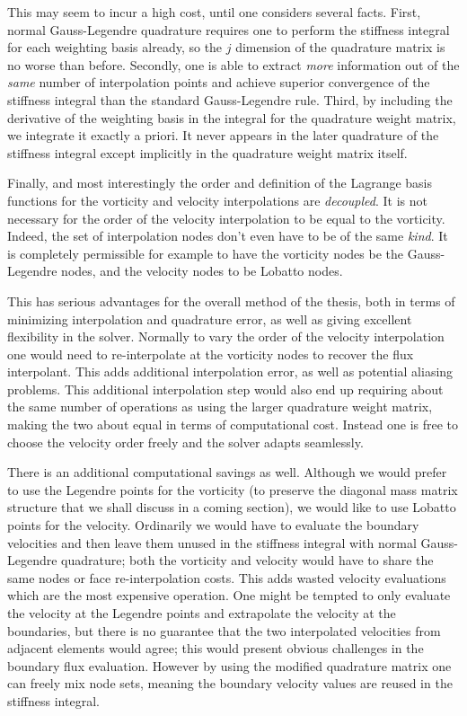 \documentclass[letterpaper,12pt]{report}
\begin{document}
This may seem to incur a high cost, until one considers several facts. First, normal Gauss-Legendre quadrature requires one to perform the stiffness integral for each weighting basis already, so the $j$ dimension of the quadrature matrix is no worse than before. Secondly, one is able to extract \textit{more} information out of the \textit{same} number of interpolation points and achieve superior convergence of the stiffness integral than the standard Gauss-Legendre rule. Third, by including the derivative of the weighting basis in the integral for the quadrature weight matrix, we integrate it exactly a priori. It never appears in the later quadrature of the stiffness integral except implicitly in the quadrature weight matrix itself.

Finally, and most interestingly the order and definition of the Lagrange basis functions for the vorticity and velocity interpolations are \textit{decoupled}. It is not necessary for the order of the velocity interpolation to be equal to the vorticity. Indeed, the set of interpolation nodes don't even have to be of the same \textit{kind}. It is completely permissible for example to have the vorticity nodes be the Gauss-Legendre nodes, and the velocity nodes to be Lobatto nodes.

This has serious advantages for the overall method of the thesis, both in terms of minimizing interpolation and quadrature error, as well as giving excellent flexibility in the solver. Normally to vary the order of the velocity interpolation one would need to re-interpolate at the vorticity nodes to recover the flux interpolant. This adds additional interpolation error, as well as potential aliasing problems. This additional interpolation step would also end up requiring about the same number of operations as using the larger quadrature weight matrix, making the two about equal in terms of computational cost. Instead one is free to choose the velocity order freely and the solver adapts seamlessly.

There is an additional computational savings as well. Although we would prefer to use the Legendre points for the vorticity (to preserve the diagonal mass matrix structure that we shall discuss in a coming section), we would like to use Lobatto points for the velocity. Ordinarily we would have to evaluate the boundary velocities and then leave them unused in the stiffness integral with normal Gauss-Legendre quadrature; both the vorticity and velocity would have to share the same  nodes or face re-interpolation costs. This adds wasted velocity evaluations which are the most expensive operation. One might be tempted to only evaluate the velocity at the Legendre points and extrapolate the velocity at the boundaries, but there is no guarantee that the two interpolated velocities from adjacent elements would agree; this would present obvious challenges in the boundary flux evaluation. However by using the modified quadrature matrix one can freely mix node sets, meaning the boundary velocity values are reused in the stiffness integral.
\end{document}
